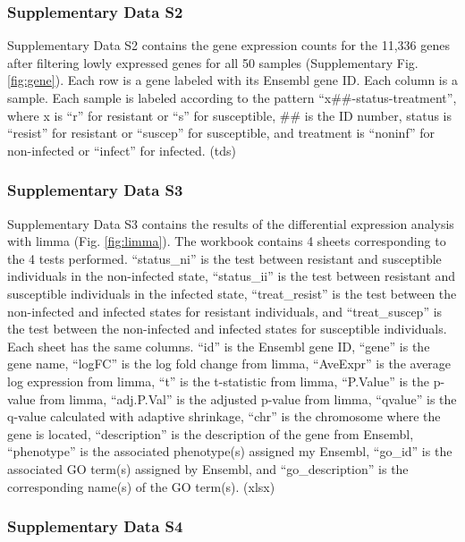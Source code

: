 \documentclass[fleqn,10pt]{wlscirep}
\begin{document}
\subsubsection*{Supplementary Data S2}

Supplementary Data S2 contains the gene expression counts for the
11,336 genes after filtering lowly expressed genes for all 50 samples
(Supplementary Fig. \ref{fig:gene}). Each row is a gene labeled with
its Ensembl gene ID. Each column is a sample. Each sample is labeled
according to the pattern “x\#\#-status-treatment”, where x is “r” for
resistant or “s” for susceptible, \#\# is the ID number, status is
“resist” for resistant or “suscep” for susceptible, and treatment is
“noninf” for non-infected or “infect” for infected. (tds)
\subsubsection*{Supplementary Data S3}

Supplementary Data S3 contains the results of the differential
expression analysis with limma (Fig. \ref{fig:limma}). The workbook
contains 4 sheets corresponding to the 4 tests performed. “status\_ni”
is the test between resistant and susceptible individuals in the
non-infected state, “status\_ii” is the test between resistant and
susceptible individuals in the infected state, “treat\_resist” is the
test between the non-infected and infected states for resistant
individuals, and “treat\_suscep” is the test between the non-infected
and infected states for susceptible individuals. Each sheet has the
same columns. “id” is the Ensembl gene ID, “gene” is the gene name,
“logFC” is the log fold change from limma, “AveExpr” is the average
log expression from limma, “t” is the t-statistic from limma,
“P.Value” is the p-value from limma, “adj.P.Val” is the adjusted
p-value from limma, “qvalue” is the q-value calculated with adaptive
shrinkage, “chr” is the chromosome where the gene is located,
“description” is the description of the gene from Ensembl, “phenotype”
is the associated phenotype(s) assigned my Ensembl, “go\_id” is the
associated GO term(s) assigned by Ensembl, and “go\_description” is
the corresponding name(s) of the GO term(s). (xlsx)
\subsubsection*{Supplementary Data S4}
\end{document}
